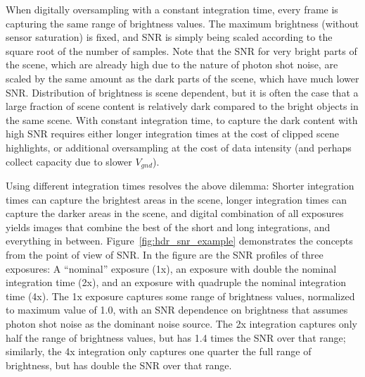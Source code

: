\documentclass[10pt,journal]{IEEEtran}  %
\begin{document}
When digitally oversampling with a constant integration time, every frame is capturing the same range of brightness values.  The maximum brightness (without sensor saturation) is fixed, and SNR is simply being scaled according to the square root of the number of samples.  Note that the SNR for very bright parts of the scene, which are already high due to the nature of photon shot noise, are scaled by the same amount as the dark parts of the scene, which have much lower SNR. Distribution of brightness is scene dependent, but it is often the case that a large fraction of scene content is relatively dark compared to the bright objects in the same scene.  With constant integration time, to capture the dark content with high SNR requires either longer integration times at the cost of clipped scene highlights, or additional oversampling at the cost of data intensity (and perhaps collect capacity due to slower $V_{gnd}$).

Using different integration times resolves the above dilemma: Shorter integration times can capture the brightest areas in the scene, longer integration times can capture the darker areas in the scene, and digital combination of all exposures yields images that combine the best of the short and long integrations, and everything in between.  Figure~\ref{fig:hdr_snr_example} demonstrates the concepts from the point of view of SNR. In the figure are the SNR profiles of three exposures:  A ``nominal'' exposure (1x), an exposure with double the nominal integration time (2x), and an exposure with quadruple the nominal integration time (4x). The 1x exposure captures some range of brightness values, normalized to maximum value of 1.0, with an SNR dependence on brightness that assumes photon shot noise as the dominant noise source. The 2x integration captures only half the range of brightness values, but has 1.4 times the SNR over that range; similarly, the 4x integration only captures one quarter the full range of brightness, but has double the SNR over that range.
\end{document}
